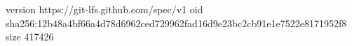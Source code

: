 version https://git-lfs.github.com/spec/v1
oid sha256:12b48a4bf66a4d78d6962ced729962fad16d9e23bc2cb91e1e7522e8171952f8
size 417426
